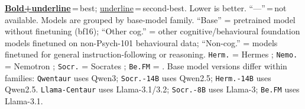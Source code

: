 \begin{table}
\begin{minipage}{\ctrtblwd}
{\tiny \underline{\textbf{Bold+underline}}\,=\,best; \underline{underline}\,=\,second-best. Lower is better. ``---''\,=\,not available. Models are grouped by base-model family. ``Base'' = pretrained model without finetuning (bf16); ``Other cog.'' = other cognitive/behavioural foundation models finetuned on non-Psych-101 behavioural data; ``Non-cog.'' = models finetuned for general instruction-following or reasoning. \texttt{Herm.} = Hermes \citep{teknium2024hermes3technicalreport}; \texttt{Nemo.} = Nemotron \citep{bercovich2025nemotron}; \texttt{Socr.} = Socrates \citep{kolluri2025finetuning}; \texttt{Be.FM} = \citet{xie2025fm}. Base model versions differ within families: \texttt{Qwentaur} uses Qwen3; \texttt{Socr.-14B} uses Qwen2.5; \texttt{Herm.-14B} uses Qwen2.5. \texttt{Llama-Centaur} uses Llama-3.1/3.2; \texttt{Socr.-8B} uses Llama-3; \texttt{Be.FM} uses Llama-3.1.}
\end{minipage}
\captionsetup{width=\ctrtblwd}
\caption{\textbf{Comparison of cognitively finetuned models with other behavioural foundation models and non-cognitive controls on Psych-101, grouped by base-model family (continued).}}
\label{tab:psych101_pe_control_cont}
\end{table}
